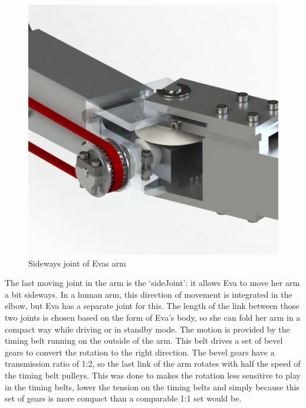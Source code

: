 \documentclass[technical_document.tex]{subfiles}
\begin{document}
\begin{figure}[ht!]
	\centering
	\mbox{\includegraphics[scale=1.0]{Images/arm_sideJoint.png}}
	\caption{Sideways joint of Eva\textquotesingle{}s arm}
	\label{fig:arm_sideJoint}
\end{figure}

The last moving joint in the arm is the ‘sideJoint’: it allows Eva to move her arm a bit sideways. In a human arm, this direction of movement is integrated in the elbow, but Eva has a separate joint for this. The length of the link between those two joints is chosen based on the form of Eva’s body, so she can fold her arm in a compact way while driving or in standby mode. The motion is provided by the timing belt running on the outside of the arm. This belt drives a set of bevel gears to convert the rotation to the right direction. The bevel gears have a transmission ratio of 1:2, so the last link of the arm rotates with half the speed of the timing belt pulleys. This was done to makes the rotation less sensitive to play in the timing belts, lower the tension on the timing belts and simply because this set of gears is more compact than a comparable 1:1 set would be.
\end{document}
